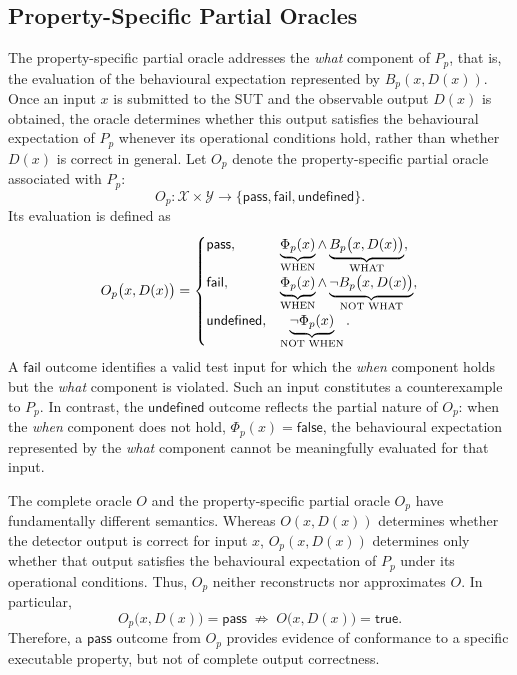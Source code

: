 \documentclass[preprint,12pt]{elsarticle}
\begin{document}
\subsection{Property-Specific Partial Oracles}
\label{sec:partial_oracles}

The property-specific partial oracle addresses the \emph{what} component of
\(P_p\), that is, the evaluation of the behavioural expectation represented
by \(B_p(x,D(x))\). Once an input \(x\) is submitted to the SUT and the
observable output \(D(x)\) is obtained, the oracle determines whether this
output satisfies the behavioural expectation of \(P_p\) whenever its
operational conditions hold, rather than whether \(D(x)\) is correct in
general. Let \(O_p\) denote the property-specific partial oracle associated with
\(P_p\):
\begin{equation}
    O_p :
    \mathcal{X} \times \mathcal{Y}
    \rightarrow
    \{\mathsf{pass},\mathsf{fail},\mathsf{undefined}\}.
    \label{eq:partial_oracle}
\end{equation}
Its evaluation is defined as
\begin{equation}
O_p\bigl(x,D(x)\bigr)
=
\begin{cases}
\mathsf{pass},
&
\underbrace{\Phi_p(x)}_{\text{\scriptsize WHEN}}
\land
\underbrace{B_p\bigl(x,D(x)\bigr)}_{\text{\scriptsize WHAT}},
\\[1mm]
\mathsf{fail},
&
\underbrace{\Phi_p(x)}_{\text{\scriptsize WHEN}}
\land
\underbrace{\neg B_p\bigl(x,D(x)\bigr)}_{\text{\scriptsize NOT WHAT}},
\\[1mm]
\mathsf{undefined},
&
\underbrace{\neg \Phi_p(x)}_{\text{\scriptsize NOT WHEN}}.
\end{cases}
\label{eq:partial_oracle_evaluation}
\end{equation}
A \(\mathsf{fail}\) outcome identifies a valid test input for which the
\emph{when} component holds but the \emph{what} component is violated. Such
an input constitutes a counterexample to \(P_p\). In contrast, the
\(\mathsf{undefined}\) outcome reflects the partial nature of \(O_p\): when
the \emph{when} component does not hold, \(\Phi_p(x)=\mathsf{false}\), the
behavioural expectation represented by the \emph{what} component cannot be
meaningfully evaluated for that input.

The complete oracle \(O\) and the property-specific partial oracle \(O_p\)
have fundamentally different semantics. Whereas \(O(x,D(x))\) determines
whether the detector output is correct for input \(x\), \(O_p(x,D(x))\)
determines only whether that output satisfies the behavioural expectation of
\(P_p\) under its operational conditions. Thus, \(O_p\) neither reconstructs
nor approximates \(O\). In particular,
\begin{equation}
    O_p\bigl(x,D(x)\bigr)=\mathsf{pass}
    \;\not\Rightarrow\;
    O\bigl(x,D(x)\bigr)=\mathsf{true}.
    \label{eq:partial_vs_complete_oracle}
\end{equation}
Therefore, a \(\mathsf{pass}\) outcome from \(O_p\) provides evidence of
conformance to a specific executable property, but not of complete output
correctness.
\end{document}
